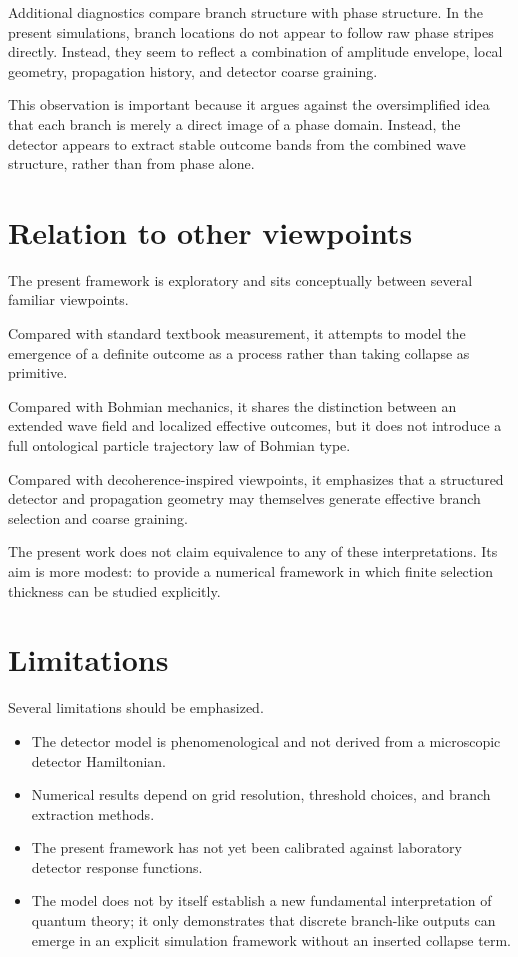 \documentclass[aps,prl,reprint]{revtex4-2}
\begin{document}
Additional diagnostics compare branch structure with phase structure.
In the present simulations, branch locations do not appear to follow raw phase
stripes directly. Instead, they seem to reflect a combination of amplitude
envelope, local geometry, propagation history, and detector coarse graining.

This observation is important because it argues against the oversimplified idea
that each branch is merely a direct image of a phase domain. Instead, the
detector appears to extract stable outcome bands from the combined wave
structure, rather than from phase alone.

\section{Relation to other viewpoints}

The present framework is exploratory and sits conceptually between several
familiar viewpoints.

Compared with standard textbook measurement, it attempts to model the emergence
of a definite outcome as a process rather than taking collapse as primitive.

Compared with Bohmian mechanics, it shares the distinction between an extended
wave field and localized effective outcomes, but it does not introduce a full
ontological particle trajectory law of Bohmian type.

Compared with decoherence-inspired viewpoints, it emphasizes that a structured
detector and propagation geometry may themselves generate effective branch
selection and coarse graining.

The present work does not claim equivalence to any of these interpretations.
Its aim is more modest: to provide a numerical framework in which finite
selection thickness can be studied explicitly.

\section{Limitations}

Several limitations should be emphasized.

\begin{itemize}
\item The detector model is phenomenological and not derived from a microscopic
detector Hamiltonian.

\item Numerical results depend on grid resolution, threshold choices, and branch
extraction methods.

\item The present framework has not yet been calibrated against laboratory
detector response functions.

\item The model does not by itself establish a new fundamental interpretation of
quantum theory; it only demonstrates that discrete branch-like outputs can
emerge in an explicit simulation framework without an inserted collapse term.
\end{itemize}
\end{document}
